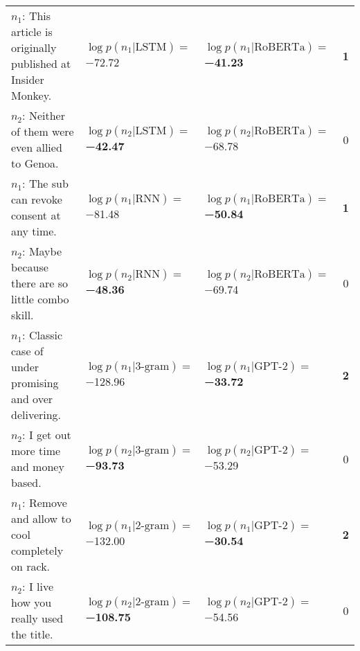 \begin{tabularx}{\textwidth}{lllc}
     $n_1$: This article is originally published at Insider Monkey. &              $\log p(n_1 | \textrm{LSTM})=$\num{-72.72} &  $\log p(n_1 | \textrm{RoBERTa})=$\textbf{\num{-41.23}} &  \textbf{\num{1}} \\
                  $n_2$: Neither of them were even allied to Genoa. &     $\log p(n_2 | \textrm{LSTM})=$\textbf{\num{-42.47}} &           $\log p(n_2 | \textrm{RoBERTa})=$\num{-68.78} &           \num{0} \\\midrule
                     $n_1$: The sub can revoke consent at any time. &               $\log p(n_1 | \textrm{RNN})=$\num{-81.48} &  $\log p(n_1 | \textrm{RoBERTa})=$\textbf{\num{-50.84}} &  \textbf{\num{1}} \\
              $n_2$: Maybe because there are so little combo skill. &      $\log p(n_2 | \textrm{RNN})=$\textbf{\num{-48.36}} &           $\log p(n_2 | \textrm{RoBERTa})=$\num{-69.74} &           \num{0} \\\midrule
        $n_1$: Classic case of under promising and over delivering. &           $\log p(n_1 | \textrm{3-gram})=$\num{-128.96} &    $\log p(n_1 | \textrm{GPT-2})=$\textbf{\num{-33.72}} &  \textbf{\num{2}} \\
                        $n_2$: I get out more time and money based. &   $\log p(n_2 | \textrm{3-gram})=$\textbf{\num{-93.73}} &             $\log p(n_2 | \textrm{GPT-2})=$\num{-53.29} &           \num{0} \\\midrule
                $n_1$: Remove and allow to cool completely on rack. &           $\log p(n_1 | \textrm{2-gram})=$\num{-132.00} &    $\log p(n_1 | \textrm{GPT-2})=$\textbf{\num{-30.54}} &  \textbf{\num{2}} \\
                       $n_2$: I live how you really used the title. &  $\log p(n_2 | \textrm{2-gram})=$\textbf{\num{-108.75}} &             $\log p(n_2 | \textrm{GPT-2})=$\num{-54.56} &           \num{0} \\
\bottomrule
\end{tabularx}
